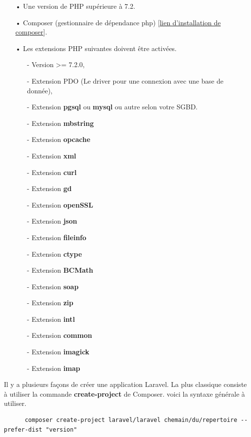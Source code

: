 \documentclass[12pt,a4paper]{article}
\begin{document}
\begin{itemize}
\item[•] Une version de PHP supérieure à 7.2.
\item[•] Composer (gestionnaire de dépendance php) [\href{https://getcomposer.org/download/}{lien d'installation de composer}].
\item[•] Les extensions PHP suivantes doivent être activées.

\begin{itemize}
\item[-] Version >= 7.2.0,
\item[-] Extension PDO (Le driver pour une connexion avec une base de donnée),
\item[-] Extension \textbf{pgsql} ou \textbf{mysql} ou autre selon votre SGBD.
\item[-] Extension \textbf{mbstring}
\item[-] Extension \textbf{opcache}
\item[-] Extension \textbf{xml}
\item[-] Extension \textbf{curl}
\item[-] Extension \textbf{gd}
\item[-] Extension \textbf{openSSL}
\item[-] Extension \textbf{json}
\item[-] Extension \textbf{fileinfo}
\item[-] Extension \textbf{ctype}
\item[-] Extension \textbf{BCMath}
\item[-] Extension \textbf{soap}
\item[-] Extension \textbf{zip}
\item[-] Extension \textbf{intl}
\item[-] Extension \textbf{common}
\item[-] Extension \textbf{imagick}
\item[-] Extension \textbf{imap}
\end{itemize}

\end{itemize}


Il y a plusieurs façons de créer une application Laravel. La plus classique consiste à utiliser la commande 
\textbf{create-project} de Composer. voici la syntaxe générale à utiliser.

\begin{verbatim}
      composer create-project laravel/laravel chemain/du/repertoire --prefer-dist "version"
\end{verbatim} 
\end{document}
